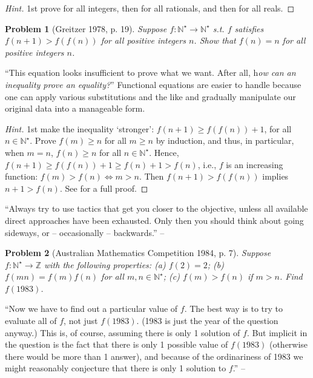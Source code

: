 \documentclass{article}
\numberwithin{equation}{section}
\newtheorem{problem}{Problem}[section]
\begin{document}
\begin{proof}[Hint]
	1st prove for all integers, then for all rationals, and then for all reals.
\end{proof}

\begin{problem}[Greitzer 1978, p. 19]
	Suppose $f:\mathbb{N}^\star\to\mathbb{N}^\star$ s.t. $f$ satisfies $f(n + 1) > f(f(n))$ for all positive integers $n$. Show that $f(n) = n$ for all positive integers $n$.
\end{problem}
``This equation looks insufficient to prove what we want. After all, h\textit{ow can an inequality prove an equality?}'' Functional equations are easier to handle because one can apply various substitutions and the like and gradually manipulate our original data into a manageable form.

\begin{proof}[Hint]
	1st make the inequality `stronger': $f(n + 1)\ge f(f(n)) + 1$, for all $n\in\mathbb{N}^\star$. Prove $f(m)\ge n$ for all $m\ge n$ by induction, and thus, in particular, when $m = n$, $f(n)\ge n$ for all $n\in\mathbb{N}^\star$. Hence, $f(n + 1)\ge f(f(n)) + 1\ge f(n) + 1 > f(n)$, i.e., $f$ is an increasing function: $f(m) > f(n)\Leftrightarrow m > n$. Then $f(n + 1) > f(f(n))$ implies $n + 1 > f(n)$. See \cite[pp. 36--38]{Tao2006} for a full proof.
\end{proof}
``Always try to use tactics that get you closer to the objective, unless all available direct approaches have been exhausted. Only then you should think about going sideways, or -- occasionally -- backwards.'' -- \cite[p. 37]{Tao2006}

\begin{problem}[Australian Mathematics Competition 1984, p. 7]
	\label{prob: Australian Mathematics Competition 1984, p. 7}
	Suppose $f:\mathbb{N}^\star\to\mathbb{Z}$ with the following properties: (a) $f(2) = 2$; (b) $f(mn) = f(m)f(n)$ for all $m,n\in\mathbb{N}^\star$; (c) $f(m) > f(n)$ if $m > n$. Find $f(1983)$.
\end{problem}
``Now we have to find out a particular value of $f$. The best way is to try to evaluate all of $f$, not just $f(1983)$. (1983 is just the year of the question anyway.) This is, of course, assuming there is only 1 solution of $f$. But implicit in the question is the fact that there is only 1 possible value of $f(1983)$ (otherwise there would be more than 1 answer), and because of the ordinariness of 1983 we might reasonably conjecture that there is only 1 solution to $f$.'' -- \cite[p. 39]{Tao2006}
\end{document}
